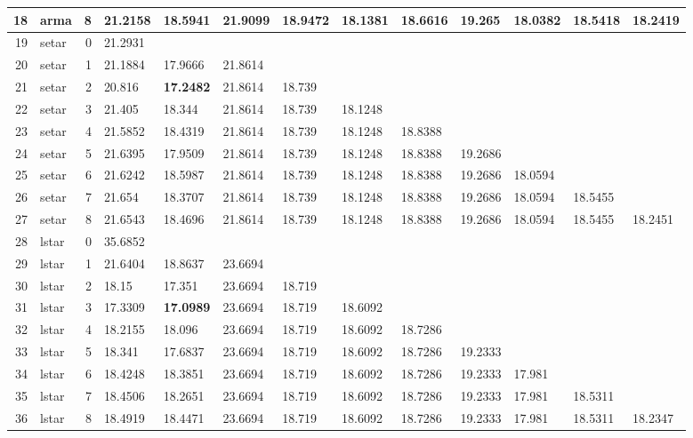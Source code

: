 \documentclass[10pt,a4paper]{article}
\begin{document}
\begin{table}[ht]
\begin{tabular}{rlrllllllllll}
  18 & arma &     8 & 21.2158 & 18.5941 & 21.9099 & 18.9472 & 18.1381 & 18.6616 & 19.265 & 18.0382 & 18.5418 & 18.2419 \\ 
   \hline
19 & setar &     0 & 21.2931 &  &  &  &  &  &  &  &  &  \\ 
  20 & setar &     1 & 21.1884 & 17.9666 & 21.8614 &  &  &  &  &  &  &  \\ 
  21 & setar &     2 & 20.816 & \textbf{17.2482} & 21.8614 & 18.739 &  &  &  &  &  &  \\ 
  22 & setar &     3 & 21.405 & 18.344 & 21.8614 & 18.739 & 18.1248 &  &  &  &  &  \\ 
  23 & setar &     4 & 21.5852 & 18.4319 & 21.8614 & 18.739 & 18.1248 & 18.8388 &  &  &  &  \\ 
  24 & setar &     5 & 21.6395 & 17.9509 & 21.8614 & 18.739 & 18.1248 & 18.8388 & 19.2686 &  &  &  \\ 
  25 & setar &     6 & 21.6242 & 18.5987 & 21.8614 & 18.739 & 18.1248 & 18.8388 & 19.2686 & 18.0594 &  &  \\ 
  26 & setar &     7 & 21.654 & 18.3707 & 21.8614 & 18.739 & 18.1248 & 18.8388 & 19.2686 & 18.0594 & 18.5455 &  \\ 
  27 & setar &     8 & 21.6543 & 18.4696 & 21.8614 & 18.739 & 18.1248 & 18.8388 & 19.2686 & 18.0594 & 18.5455 & 18.2451 \\ 
   \hline
28 & lstar &     0 & 35.6852 &  &  &  &  &  &  &  &  &  \\ 
  29 & lstar &     1 & 21.6404 & 18.8637 & 23.6694 &  &  &  &  &  &  &  \\ 
  30 & lstar &     2 & 18.15 & 17.351 & 23.6694 & 18.719 &  &  &  &  &  &  \\ 
  31 & lstar &     3 & 17.3309 & \textbf{17.0989} & 23.6694 & 18.719 & 18.6092 &  &  &  &  &  \\ 
  32 & lstar &     4 & 18.2155 & 18.096 & 23.6694 & 18.719 & 18.6092 & 18.7286 &  &  &  &  \\ 
  33 & lstar &     5 & 18.341 & 17.6837 & 23.6694 & 18.719 & 18.6092 & 18.7286 & 19.2333 &  &  &  \\ 
  34 & lstar &     6 & 18.4248 & 18.3851 & 23.6694 & 18.719 & 18.6092 & 18.7286 & 19.2333 & 17.981 &  &  \\ 
  35 & lstar &     7 & 18.4506 & 18.2651 & 23.6694 & 18.719 & 18.6092 & 18.7286 & 19.2333 & 17.981 & 18.5311 &  \\ 
  36 & lstar &     8 & 18.4919 & 18.4471 & 23.6694 & 18.719 & 18.6092 & 18.7286 & 19.2333 & 17.981 & 18.5311 & 18.2347 \\ 

\end{tabular}
\end{table}
\end{document}
